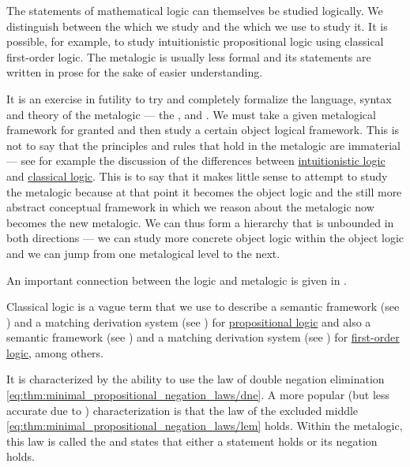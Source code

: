 \begin{remark}\label{rem:metalogic}
  The statements of mathematical logic can themselves be studied logically. We distinguish between the  which we study and the  which we use to study it. It is possible, for example, to study intuitionistic propositional logic using classical first-order logic. The metalogic is usually less formal and its statements are written in prose for the sake of easier understanding.

  It is an exercise in futility to try and completely formalize the language, syntax and theory of the metalogic --- the ,  and . We must take a given metalogical framework for granted and then study a certain object logical framework. This is not to say that the principles and rules that hold in the metalogic are immaterial --- see for example the discussion of the differences between \hyperref[def:intuitionistic_logic]{intuitionistic logic} and \hyperref[def:classical_logic]{classical logic}. This is to say that it makes little sense to attempt to study the metalogic because at that point it becomes the object logic and the still more abstract conceptual framework in which we reason about the metalogic now becomes the new metalogic. We can thus form a hierarchy that is unbounded in both directions --- we can study more concrete object logic within the object logic and we can jump from one metalogical level to the next.

  An important connection between the logic and metalogic is given in .
\end{remark}

\begin{definition}\label{def:classical_logic}
  Classical logic is a vague term that we use to describe a semantic framework (see ) and a matching derivation system (see ) for \hyperref[subsec:propositional_logic]{propositional logic} and also a semantic framework (see ) and a matching derivation system (see ) for \hyperref[subsec:first_order_logic]{first-order logic}, among others.

  It is characterized by the ability to use the law of double negation elimination \eqref{eq:thm:minimal_propositional_negation_laws/dne}. A more popular (but less accurate due to ) characterization is that the law of the excluded middle \eqref{eq:thm:minimal_propositional_negation_laws/lem} holds. Within the metalogic, this law is called the  and states that either a statement holds or its negation holds.
\end{definition}

